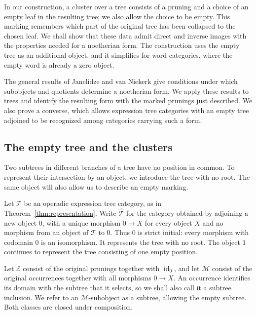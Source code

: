 \documentclass[11pt,a4paper]{article}
\theoremstyle{plain}
\theoremstyle{definition}
\theoremstyle{remark}
\newcommand{\id}{\operatorname{id}}
\begin{document}
In our construction, a cluster over a tree consists of a pruning
and a choice of an empty leaf in the resulting tree; we also allow
the choice to be empty. This marking remembers which part of the
original tree has been collapsed to the chosen leaf. We shall show
that these data admit direct and inverse images with the properties
needed for a noetherian form. The construction uses the empty tree
as an additional object, and it simplifies for word categories,
where the empty word is already a zero object.

The general results of Janelidze and van Niekerk
\cite[Theorems 159 and 163]{JanelidzeVanNiekerk} give conditions
under which subobjects and quotients determine a noetherian form.
We apply these results to trees and identify the resulting form
with the marked prunings just described. We also prove a converse,
which allows expression tree categories with an empty tree adjoined
to be recognized among categories carrying such a form.

\subsection{The empty tree and the clusters}\label{sec:tree-form-construction}
Two subtrees in different branches of a tree have no position in
common. To represent their intersection by an object, we introduce
the tree with no root. The same object will also allow us to
describe an empty marking.

\label{not:augmented-tree-category}
Let $\mathcal T$ be an operadic expression tree category, as in
Theorem~\ref{thm:representation}. Write $\widehat{\mathcal T}$
for the category obtained by
adjoining a new object $0$, with a unique morphism $0\to X$ for
every object $X$ and no morphism from an object of $\mathcal T$
to $0$.
Thus $0$ is strict initial: every morphism with codomain $0$ is
an isomorphism. It represents the tree with no root. The object
$1$ continues to represent the tree consisting of one empty position.

\label{not:augmented-tree-classes}
Let $\mathcal E$ consist of the original prunings together with
$\id_0$, and let $\mathcal M$ consist of the original occurrences
together with all morphisms $0\to X$. An occurrence identifies
its domain with the subtree that it selects, so we shall also
call it a subtree inclusion. We refer to an
$\mathcal M$-subobject as a subtree, allowing the empty subtree.
Both classes are closed under composition.
\end{document}
